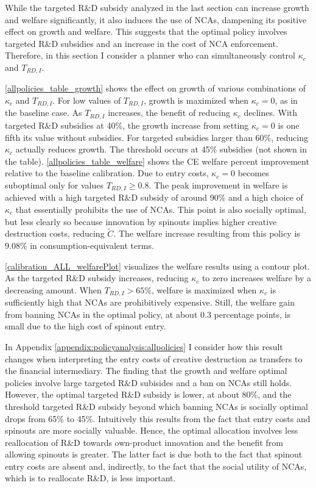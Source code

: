 \documentclass[11pt,english]{article}
\theoremstyle{definition}
\begin{document}
While the targeted R\&D subsidy analyzed in the last section can increase growth and welfare significantly, it also induces the use of NCAs, dampening its positive effect on growth and welfare. This suggests that the optimal policy involves targeted R\&D subsidies and an increase in the cost of NCA enforcement. Therefore, in this section I consider a planner who can simultaneously control $\kappa_c$ and $T_{RD,I}$. 

\autoref{allpolicies_table_growth} shows the effect on growth of various combinations of $\kappa_c$ and $T_{RD,I}$. For low values of $T_{RD,I}$, growth is maximized when $\kappa_c = 0$, as in the baseline case. As $T_{RD,I}$ increases, the benefit of reducing $\kappa_c$ declines. With targeted R\&D subsidies at 40\%, the growth increase from setting $\kappa_c = 0$ is one fifth its value without subsidies. For targeted subsidies larger than 60\%, reducing $\kappa_c$ actually reduces growth. The threshold occurs at 45\% subsidies (not shown in the table). \autoref{allpolicies_table_welfare} shows the CE welfare percent improvement relative to the baseline calibration. Due to entry costs, $\kappa_c = 0$ becomes suboptimal only for values $T_{RD,I} \ge 0.8$. The peak improvement in welfare is achieved with a high targeted R\&D subsidy of around 90\% and a high choice of $\kappa_c$ that essentially prohibits the use of NCAs. This point is also socially optimal, but less clearly so because innovation by spinouts implies higher creative destruction costs, reducing $\tilde{C}$. The welfare increase resulting from this policy is 9.08\% in consumption-equivalent terms. 

\autoref{calibration_ALL_welfarePlot} visualizes the welfare results using a contour plot. As the targeted R\&D subsidy increases, reducing $\kappa_c$ to zero increases welfare by a decreasing amount. When $T_{RD,I} > 65\%$, welfare is maximized when $\kappa_c$ is sufficiently high that NCAs are prohibitively expensive. Still, the welfare gain from banning NCAs in the optimal policy, at about 0.3 percentage points, is small due to the high cost of spinout entry.

In Appendix \ref{appendix:policyanalysis:allpolicies} I consider how this result changes when interpreting the entry costs of creative destruction as transfers to the financial intermediary. The finding that the growth and welfare optimal policies involve large targeted R\&D subisides and a ban on NCAs still holds. However, the optimal targeted R\&D subsidy is lower, at about 80\%, and the threshold targeted R\&D subsidy beyond which banning NCAs is socially optimal drops from 65\% to 45\%. Intuitively this results from the fact that entry costs and spinouts are more socially valuable. Hence, the optimal allocation involves less reallocation of R\&D towards own-product innovation and the benefit from allowing spinouts is greater. The latter fact is due both to the fact that spinout entry costs are absent and, indirectly, to the fact that the social utility of NCAs, which is to reallocate R\&D, is less important.
\end{document}
